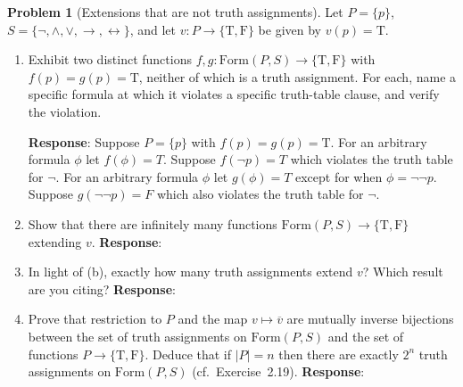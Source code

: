 \documentclass[11pt]{article}
\newcommand{\Form}{\mathrm{Form}}
\newcommand{\T}{\mathrm{T}}
\newcommand{\F}{\mathrm{F}}
\newcommand{\TF}{\{\T,\F\}}
\newcommand{\ext}[1]{\overline{#1}}
\newcommand{\Sfive}{\{\lnot,\land,\lor,\to,\leftrightarrow\}}
\theoremstyle{definition}
\newtheorem{problem}{Problem}
\begin{document}
\begin{problem}[Extensions that are not truth assignments]
Let $P=\{p\}$, $S=\Sfive$, and let $v\colon P\to\TF$ be given by $v(p)=\T$.
\begin{enumerate}
\item[(a)] Exhibit two distinct functions $f,g\colon\Form(P,S)\to\TF$ with
$f(p)=g(p)=\T$, neither of which is a truth assignment. For each, name a specific
formula at which it violates a specific truth-table clause, and verify the
violation.

\textbf{Response}:
Suppose $P = \{ p \}$ with $f(p)=g(p)=\T$.
For an arbitrary formula $\phi$ let $f(\phi) = T$.
Suppose $f(\neg p) = T$ which violates the truth table for $\neg$.
For an arbitrary formula $\phi$ let $g(\phi) = T$ except for when $\phi = \neg\neg p$.
Suppose $g(\neg\neg p) = F$ which also violates the truth table for $\neg$.



\item[(b)] Show that there are infinitely many functions
$\Form(P,S)\to\TF$ extending $v$.
\textbf{Response}:




\item[(c)] In light of (b), exactly how many truth assignments extend $v$? Which
result are you citing?
\textbf{Response}:




\item[(d)] Prove that restriction to $P$ and the map $v\mapsto\ext{v}$ are
mutually inverse bijections between the set of truth assignments on $\Form(P,S)$
and the set of functions $P\to\TF$. Deduce that if $|P|=n$ then there are exactly
$2^n$ truth assignments on $\Form(P,S)$ (cf.\ Exercise~2.19).
\textbf{Response}:


\end{enumerate}
\end{problem}
\end{document}

